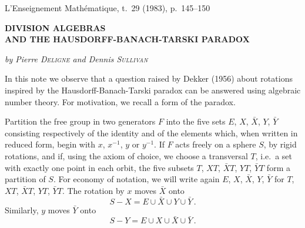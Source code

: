 \documentclass[12pt,a4paper]{article}
\theoremstyle{plain}
\theoremstyle{remark}
\begin{document}
\thispagestyle{empty}
\begin{center}
{\large\sc L'Enseignement Math\'{e}matique, t.~29 (1983), p.~145--150}
\end{center}
\vspace{1cm}

\begin{center}
{\Large\bf DIVISION ALGEBRAS\\[0.3em]
AND THE HAUSDORFF-BANACH-TARSKI PARADOX}
\end{center}

\vspace{0.5cm}
\begin{center}
\textit{by Pierre \textsc{Deligne} and Dennis \textsc{Sullivan}}
\end{center}

\vspace{0.5cm}

In this note we observe that a question raised by Dekker (1956) about
rotations inspired by the Hausdorff-Banach-Tarski paradox can be answered
using algebraic number theory. For motivation, we recall a form of the paradox.

Partition the free group in two generators $F$ into the five sets $E$, $X$, $\bar{X}$, $Y$,
$\bar{Y}$ consisting respectively of the identity and of the elements which, when written
in reduced form, begin with $x$, $x^{-1}$, $y$ or $y^{-1}$. If $F$ acts freely on a sphere $S$,
by rigid rotations, and if, using the axiom of choice, we choose a transversal
$T$, i.e.\ a set with exactly one point in each orbit, the five subsets $T$, $XT$, $\bar{X}T$,
$YT$, $\bar{Y}T$ form a partition of $S$. For economy of notation, we will write again
$E$, $X$, $\bar{X}$, $Y$, $\bar{Y}$ for $T$, $XT$, $\bar{X}T$, $YT$, $\bar{Y}T$. The rotation by $x$ moves $\bar{X}$ onto
\[
S - X = E \cup \bar{X} \cup Y \cup \bar{Y}\,.
\]
Similarly, $y$ moves $\bar{Y}$ onto
\[
S - Y = E \cup X \cup \bar{X} \cup \bar{Y}\,.
\]
\end{document}

